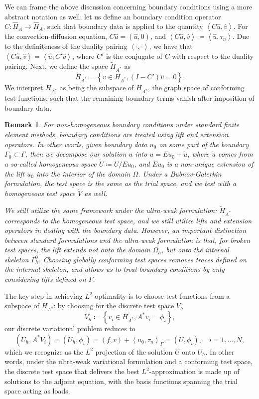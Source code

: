 \documentclass[11pt,onecolumn]{scrartcl}
\newcommand{\LRp}[1]{\left( #1 \right)}
\newcommand{\LRa}[1]{\left\langle #1 \right\rangle}
\newcommand{\LRc}[1]{\left\{ #1 \right\}}
\newcommand{\uh}{\widehat{u}}
\newtheorem{remark}{Remark}
\begin{document}
We can frame the above discussion concerning boundary conditions using a more abstract notation as well; let us define an boundary condition operator $C:\widehat{H}_{A} \rightarrow \widehat{H}_{A}$, such that boundary data is applied to the quantity $\LRa{C\widehat{u},\widehat{v}}$.  For the convection-diffusion equation, $C\widehat{u} = \LRp{\uh,0}$, and $\LRa{C\widehat{u},\widehat{v}} \coloneqq \LRa{\uh,\tau_n}$.  Due to the definiteness of the duality pairing $\LRa{\cdot,\cdot}$, we have that $\LRa{C\widehat{u},\widehat{v}} = \LRa{\widehat{u},C'\widehat{v}}$, where $C'$ is the conjugate of $C$ with respect to the duality pairing.  Next, we define the space $\tilde{H}_{A^*}$ as
\[
\tilde{H}_{A^*} = \LRc{v\in H_{A^*}, (I-C')\widehat{v} = 0}.
\]
We interpret $\tilde{H}_{A^*}$ as being the subspace of $H_{A^*}$, the graph space of conforming test functions, such that the remaining boundary terms vanish after imposition of boundary data.  

\begin{remark}
For non-homogeneous boundary conditions under standard finite element methods, boundary conditions are treated using lift and extension operators.  In other words, given boundary data $u_0$ on some part of the boundary $\Gamma_0 \subset \Gamma$, then we decompose our solution $u$ into $u = E u_0 + \tilde{u}$, where $\tilde{u}$ comes from a so-called homogeneous space $\tilde{{U}} \coloneqq {U}/Eu_0$, and $Eu_0$ is a non-unique extension of the lift $u_0$ into the interior of the domain $\Omega$.  Under a Bubnov-Galerkin formulation, the test space is the same as the trial space, and we test with a homogeneous test space $\tilde{{V}}$ as well.  

We still utilize the same framework under the ultra-weak formulation: $\tilde{H}_{A^*}$ corresponds to the homogeneous test space, and we still utilize lifts and extension operators in dealing with the boundary data.  However, an important distinction between standard formulations and the ultra-weak formulation is that, for broken test spaces, the lift extends not onto the domain $\Omega_h$, but onto the internal skeleton $\Gamma_h^0$.  Choosing globally conforming test spaces removes traces defined on the internal skeleton, and allows us to treat boundary conditions by only considering lifts defined on $\Gamma$.
\end{remark} 

The key step in achieving $L^2$ optimality is to choose test functions from a subspace of $\tilde{H}_{A^*}$: by choosing for the discrete test space $V_h$
\[
V_h \coloneqq \LRc{v_i\in \tilde{H}_{A^*}, A^*v_i = \phi_i},
\]
our discrete variational problem reduces to 
\[
\LRp{U_h,A^*V_i} = \LRp{U_h,\phi_i} = \LRp{f,v} + \LRa{u_0,\tau_n}_{\Gamma} = \LRp{U,\phi_i}, \quad i = 1,\ldots,N,
\]
which we recognize as the $L^2$ projection of the solution $U$ onto ${U}_h$.  In other words, under the ultra-weak variational formulation and a conforming test space, the discrete test space that delivers the best $L^2$-approximation is made up of solutions to the adjoint equation, with the basis functions spanning the trial space acting as loads.  
\end{document}
